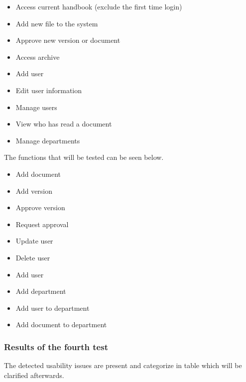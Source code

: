 \begin{itemize}
	\item Access current handbook (exclude the first time login)
	\item Add new file to the system
	\item Approve new version or document
	\item Access archive 
	\item Add user 
	\item Edit user information
	\item Manage users
	\item View who has read a document 
	\item Manage departments
\end{itemize}

The functions that will be tested can be seen below.

\begin{itemize}
	\item Add document
	\item Add version
	\item Approve version
	\item Request approval
	\item Update user
	\item Delete user
	\item Add user
	\item Add department
	\item Add user to department
	\item Add document to department
\end{itemize}

\subsubsection*{Results of the fourth test}
The detected usability issues are present and categorize in table 
 which will be clarified afterwards. 

